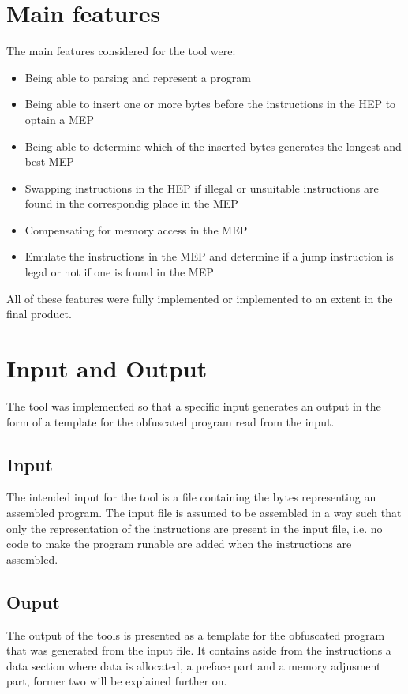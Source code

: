 \documentclass[11pt,twoside]{eitExjobb}
\begin{document}
\section{Main features}
The main features considered for the tool were:

\begin{itemize}
\item{Being able to parsing and represent a program}
\item{Being able to insert one or more bytes before the instructions in the HEP to optain a MEP}
\item{Being able to determine which of the inserted bytes generates the longest and best MEP}
\item{Swapping instructions in the HEP if illegal or unsuitable instructions are found in the correspondig place in the MEP}
\item{Compensating for memory access in the MEP}
\item{Emulate the instructions in the MEP and determine if a jump instruction is legal or not if one is found in the MEP}
\end{itemize}

\noindent All of these features were fully implemented or implemented to an extent in the final product. 

\section{Input and Output}
The tool was implemented so that a specific input generates an output in the form of a template for the obfuscated program read from the input. 

\subsection{Input}
The intended input for the tool is a file containing the bytes representing an assembled program. The input file is assumed to be assembled in a way such that only the representation of the instructions are present in the input file, i.e. no code to make the program runable are added when the instructions are assembled.


\subsection{Ouput}
The output of the tools is presented as a template for the obfuscated program that was generated from the input file. It contains aside from the instructions a data section where data is allocated, a preface part and a memory adjusment part, former two will be explained further on.
\end{document}
